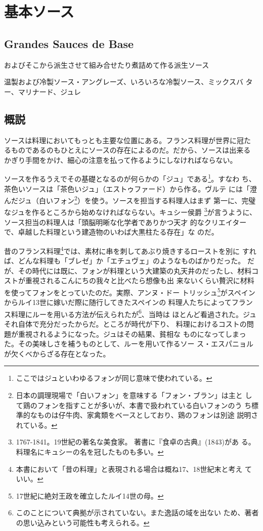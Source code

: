 \documentclass[twoside,12Q,b5j]{escoffierltjsbook}
\begin{document}
\section{基本ソース}\label{ux57faux672cux30bdux30fcux30b9}

\subsection{Grandes Sauces de Base}\label{grandes-sauces-de-base}


およびそこから派生させて組み合せたり煮詰めて作る派生ソース

温製および冷製ソース・アングレーズ、いろいろな冷製ソース、ミックスバ
ター、マリナード、ジュレ

\subsection{概説}\label{ux6982ux8aac}

ソースは料理においてもっとも主要な位置にある。フランス料理が世界に冠た
るものであるのもひとえにソースの存在によるのだ。だから、ソースは出来る
かぎり手間をかけ、細心の注意を払って作るようにしなければならない。

ソースを作るうえでその基礎となるのが何らかの「ジュ」である\footnote{ここではジュといわゆるフォンが同じ意味で使われている。}。すなわ
ち、茶色いソースは「茶色いジュ」（エストゥファード）から作る。ヴルテ
には「澄んだジュ（白いフォン\footnote{日本の調理現場で「白いフォン」を意味する「フォン・ブラン」は主と
  して鶏のフォンを指すことが多いが、本書で扱われている白いフォンのう
  ち標準的なものは仔牛肉、家禽類をベースとしており、鶏のフォンは別途
  説明されている。}）を使う。ソースを担当する料理人はまず
第一に、完璧なジュを作るところから始めなければならない。キュシー侯爵
\footnote{1767-1841。19世紀の著名な美食家。
  著書に『食卓の古典』(1843)があ
  る。料理名にキュシーの名を冠したものも多い。}が言うように、ソース担当の料理人は「頭脳明晰な化学者でありかつ天才
的なクリエイターで、卓越した料理という建造物のいわば大黒柱たる存在」な
のだ。

昔のフランス料理\footnote{本書において「昔の料理」と表現される場合は概ね17、18世紀末と考え
  ていい。}では、素材に串を刺してあぶり焼きするローストを別に
すれば、どんな料理も「ブレゼ」か「エチュヴェ」のようなものばかりだった。
だが、その時代には既に、フォンが料理という大建築の丸天井のだったし、材料コストが重視されるこんにちの我々と比べたら想像も出
来ないくらい贅沢に材料を使ってフォンをとっていたのだ。実際、アンヌ・ドー
トリッシュ\footnote{17世紀に絶対王政を確立したルイ14世の母。}がスペインからルイ13世に嫁いだ際に随行してきたスペインの
料理人たちによってフランス料理にルーを用いる方法が伝えられたが\footnote{このことについて典拠が示されていない。また逸話の域を出ない
  ため、著者の思い込みという可能性も考えられる。}、当時は
ほとんど看過された。ジュそれ自体で充分だったからだ。ところが時代が下り、
料理におけるコストの問題が重視されるようになった。ジュはその結果、貧相な
ものになってしまった。その美味しさを補うものとして、ルーを用いて作るソー
ス・エスパニョルが欠くべからざる存在となった。
\end{document}

